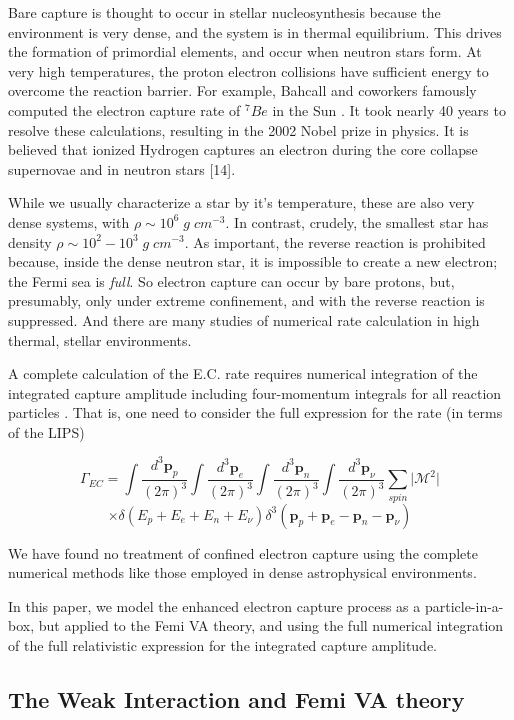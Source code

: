 \documentclass[%
 aip,
 jmp,%
 amsmath,amssymb,
 reprint,%
]{revtex4-1}
\begin{document}
Bare capture is thought to occur in stellar nucleosynthesis because the environment is very dense, and the system is in thermal equilibrium.  This drives the formation of primordial elements, and occur when neutron stars form.    At very high temperatures, the proton electron collisions have sufficient energy to overcome the reaction barrier.   For example, Bahcall and coworkers famously computed the electron capture rate of $^{7}Be$ in the Sun \cite{bahcall62,bahcall69}.  It took nearly 40 years to resolve these calculations, resulting in the 2002 Nobel prize in physics.  It is believed that ionized Hydrogen captures an electron during the core collapse supernovae and in neutron stars [14].   

While we usually characterize a star by it's temperature, these are also very dense systems, with $\rho\sim 10^6\;g\;cm^{-3}$.  In contrast, crudely, the smallest star has density $\rho\sim 10^{2}-10^{3}\;g\;cm^{-3}$.  As important, the reverse reaction is prohibited because, inside the dense neutron star, it is impossible to create a new electron; the Fermi sea is \emph{full}. So electron capture can occur by bare protons, but, presumably, only under extreme confinement, and with the reverse reaction is suppressed.   And there are many studies of numerical rate calculation in high thermal, stellar environments.   

A complete calculation of the E.C. rate requires numerical integration of  the integrated capture amplitude including four-momentum integrals for all reaction particles \cite{liu}. That is, one need to consider the full expression for the rate (in terms of the LIPS)

$$\Gamma_{EC}=\int\dfrac{d^{3}\mathbf{p}_{p}}{(2\pi)^{3}}\int\dfrac{d^{3}\mathbf{p}_{e}}{(2\pi)^{3}}\int\dfrac{d^{3}\mathbf{p}_{n}}{(2\pi)^{3}}\int\dfrac{d^{3}\mathbf{p}_{\nu}}{(2\pi)^{3}}\sum\limits_{spin}\vert\mathcal{M}^{2}\vert$$
$$\times\delta(E_{p}+E_{e}+E_{n}+E_{\nu})\delta^{3}(\mathbf{p}_{p}+\mathbf{p}_{e}-\mathbf{p}_{n}-\mathbf{p}_{\nu})$$

We have found no treatment of confined electron capture using the complete numerical methods like those employed in dense astrophysical environments.

In this paper, we model the enhanced electron capture process as a particle-in-a-box, but applied to the Femi VA theory, and using the full numerical integration of the full relativistic expression for the integrated capture amplitude.

\subsection{The Weak Interaction and Femi VA theory}
\end{document}
